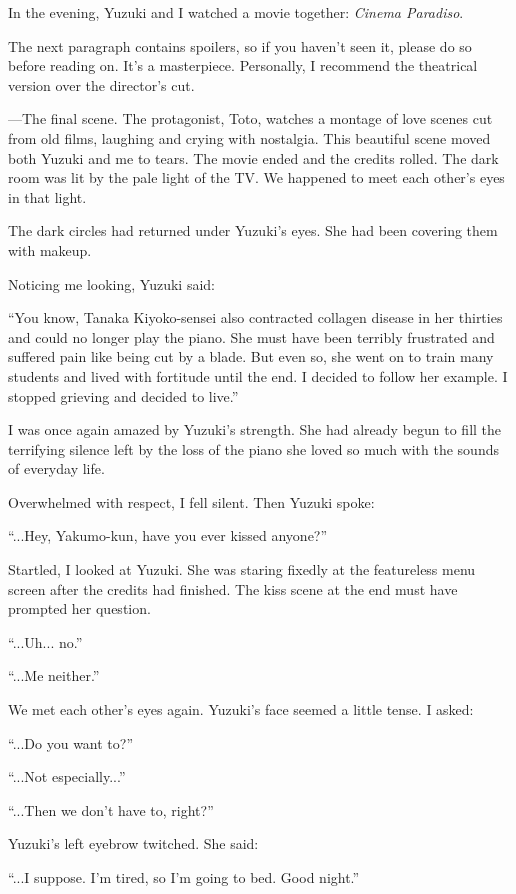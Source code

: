 \documentclass[
    a4paper,
    12pt,
    twoside,
    openany,
    UTF8,
    fontset=windows
]{ctexbook}
\begin{document}
In the evening, Yuzuki and I watched a movie together: \textit{Cinema Paradiso}.

The next paragraph contains spoilers, so if you haven't seen it, please do so before reading on. It's a masterpiece. Personally, I recommend the theatrical version over the director's cut.

---The final scene. The protagonist, Toto, watches a montage of love scenes cut from old films, laughing and crying with nostalgia. This beautiful scene moved both Yuzuki and me to tears. The movie ended and the credits rolled. The dark room was lit by the pale light of the TV. We happened to meet each other's eyes in that light.

The dark circles had returned under Yuzuki's eyes. She had been covering them with makeup.

Noticing me looking, Yuzuki said:

``You know, Tanaka Kiyoko-sensei also contracted collagen disease in her thirties and could no longer play the piano. She must have been terribly frustrated and suffered pain like being cut by a blade. But even so, she went on to train many students and lived with fortitude until the end. I decided to follow her example. I stopped grieving and decided to live.''

I was once again amazed by Yuzuki's strength. She had already begun to fill the terrifying silence left by the loss of the piano she loved so much with the sounds of everyday life.

Overwhelmed with respect, I fell silent. Then Yuzuki spoke:

``...Hey, Yakumo-kun, have you ever kissed anyone?''

Startled, I looked at Yuzuki. She was staring fixedly at the featureless menu screen after the credits had finished. The kiss scene at the end must have prompted her question.

``...Uh... no.''

``...Me neither.''

We met each other's eyes again. Yuzuki's face seemed a little tense. I asked:

``...Do you want to?''

``...Not especially...''

``...Then we don't have to, right?''

Yuzuki's left eyebrow twitched. She said:

``...I suppose. I'm tired, so I'm going to bed. Good night.''
\end{document}
